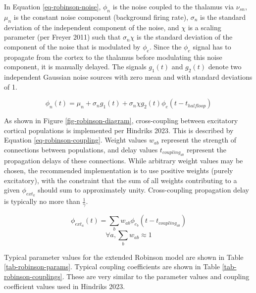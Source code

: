 In Equation \ref{eq-robinson-noise}, $\phi_n$ is the noise coupled to
the thalamus via $\nu_{sn}$, $\mu_n$ is the constant noise component
(background firing rate), $\sigma_n$ is the standard deviation of the
independent component of the noise, and $\chi$ is a scaling parameter
(per Freyer 2011) such that $\sigma_n \chi$ is the standard deviation of
the component of the noise that is modulated by $\phi_e$. Since the $\phi_e$
signal has to propagate from the cortex to the thalamus before modulating
this noise component, it is manually delayed. The signals $g_1(t)$ and
$g_2(t)$ denote two independent Gaussian noise sources with zero mean and
with standard deviations of 1.

\begin{equation}
\phi_n(t) = \mu_n + \sigma_n g_1(t)
+ \sigma_n \chi g_2(t) \phi_e(t - t_{halfloop})
\label{eq-robinson-noise}
\end{equation}

As shown in Figure \ref{fig-robinson-diagram}, cross-coupling between
excitatory cortical populations is implemented per Hindriks 2023. This is
described by Equation \ref{eq-robinson-coupling}. Weight values
$w_{ab}$ represent the strength of connections between populations, and
delay values $t_{coupling_{ab}}$ represent the propagation delays of these
connections.
While arbitrary weight values may be chosen, the recommended implementation
is to use positive weights (purely excitatory), with the constraint that the
sum of all weights contributing to a given $\phi_{ext_k}$ should sum to
approximately unity. Cross-coupling propagation delay is typically no more
than $\frac{1}{\gamma}$.

\begin{equation}
\phi_{ext_a}(t) = \sum_b w_{ab} \phi_{e_b}(t - t_{coupling_{ab}})
\label{eq-robinson-coupling}
\end{equation}
%
\begin{equation}
\forall a, \sum_b w_{ab} \approx 1
\label{eq-robinson-coupling-constraint}
\end{equation}

Typical parameter values for the extended Robinson model are shown in
Table \ref{tab-robinson-params}. Typical coupling coefficients are shown in
Table \ref{tab-robinson-couplings}. These are very similar to the parameter
values and coupling coefficient values used in Hindriks 2023.

